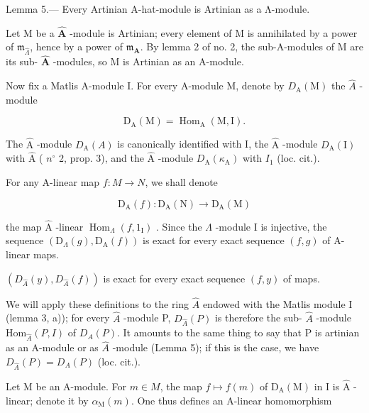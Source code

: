 Lemma 5.--- Every Artinian A-hat-module is Artinian as a Λ-module.

Let M be a \(\widehat{\mathbf{A}}\) -module is Artinian; every element of M is annihilated by a power of \(\mathfrak{m}_{\widehat{\Lambda}}\), hence by a power of \(\mathfrak{m}_{\mathbf{A}}\). By lemma 2 of no. 2, the sub-A-modules of M are its sub- \(\widehat{\mathbf{A}}\) -modules, so M is Artinian as an A-module.

Now fix a Matlis A-module I. For every A-module M, denote by \(D_{\mathrm{A}}(\mathrm{M})\) the \(\widehat{A}\) -module

\[
\mathrm{D} _ {\mathrm{A}} (\mathrm{M}) = \operatorname{Hom} _ {\mathrm{A}} (\mathrm{M}, \mathrm{I}).
\]

The \(\widehat{\mathrm{A}}\) -module \(D_{\mathrm{A}}(A)\) is canonically identified with I, the \(\widehat{\mathrm{A}}\) -module \(D_{\mathrm{A}}(\mathrm{I})\) with \(\widehat{\mathrm{A}}\) ( \(n^{\circ}\) 2, prop. 3), and the \(\widehat{\mathrm{A}}\) -module \(D_{\mathrm{A}}(\kappa_{\mathrm{A}})\) with \(I_{1}\) (loc. cit.).

For any A-linear map \(f: M \rightarrow N\), we shall denote

\[
\mathrm{D} _ {\mathrm{A}} (f): \mathrm{D} _ {\mathrm{A}} (\mathrm{N}) \rightarrow \mathrm{D} _ {\mathrm{A}} (\mathrm{M})
\]

the map \(\widehat{\mathrm{A}}\) -linear \(\operatorname{Hom}_{\Lambda}(f,1_{\mathrm{I}})\) . Since the \(\Lambda\) -module I is injective, the sequence \((\mathrm{D}_{\Lambda}(g),\mathrm{D}_{\mathrm{A}}(f))\) is exact for every exact sequence \((f,g)\) of A-linear maps.

\((D_{\hat{A}}(y), D_{\hat{A}}(f))\) is exact for every exact sequence \((f, y)\) of maps.

We will apply these definitions to the ring \(\hat{A}\) endowed with the Matlis module I (lemma 3, a)); for every \(\hat{A}\) -module P, \(D_{\hat{A}}(P)\) is therefore the sub- \(\hat{A}\) -module \(\text{Hom}_{\hat{A}}(P, I)\) of \(D_{A}(P)\). It amounts to the same thing to say that P is artinian as an A-module or as \(\hat{A}\) -module (Lemma 5); if this is the case, we have \(D_{\hat{A}}(P) = D_{A}(P)\) (loc. cit.).

Let M be an A-module. For \(m \in M\), the map \(f \mapsto f(m)\) of \(\mathrm{D}_{\mathrm{A}}(\mathrm{M})\) in I is \(\widehat{\mathrm{A}}\) -linear; denote it by \(\alpha_{\mathrm{M}}(m)\). One thus defines an A-linear homomorphism

